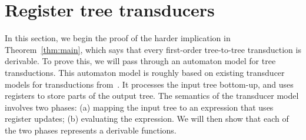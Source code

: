 


\section{Register tree transducers}
\label{sec:stt}
In this section, we begin the proof of the harder implication in Theorem~\ref{thm:main}, which says that every first-order tree-to-tree transduction is derivable. To prove this, we will pass through an automaton model for tree transductions. 
This automaton model is roughly based on existing transducer models for \mso transductions from~\cite{bloem_comparison_2000,alur2017streaming}.
It processes the input tree bottom-up, and uses registers to store parts of the output tree. The semantics of the transducer model involves two phases: (a) mapping the input tree to an expression that uses register updates; (b) evaluating the expression. We will then show that each of the two phases represents a derivable functions.

%
%


